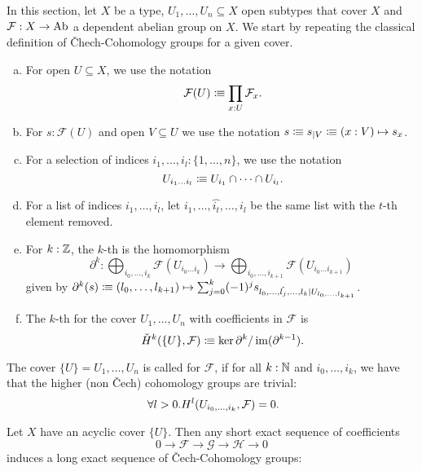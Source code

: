 
In this section, let $X$ be a type, $U_1,\dots,U_n\subseteq X$ open subtypes that cover $X$
and $\mathcal F:X\to \operatorname{Ab}$ a dependent abelian group on $X$.
We start by repeating the classical definition of \v{C}hech-Cohomology groups for a given cover.

\begin{definition}%
  \label{chech-complex}
  \begin{enumerate}[(a)]
  \item {} For open $U\subseteq X$, we use the notation
    \[
      \mathcal F(U)\colonequiv \prod_{x:U}\mathcal F_x\rlap{.}
    \]
  \item For $s:\mathcal F(U)$ and open $V\subseteq U$ we use the notation $s\vcentcolon\mspace{-1.2mu}\equiv s_{|V} \vcentcolon\mspace{-1.2mu}\equiv (x:V)\mapsto s_x$.
  \item {}For a selection of indices $i_1,...,i_l:\{1,\dots,n\}$, we use the notation
    \[
      U_{i_1\dots i_l}\colonequiv U_{i_1}\cap\dots\cap U_{i_l}\rlap{.}
    \]
  \item For a list of indices $i_1,\dots,i_l$, let $i_1,\dots,\hat{i_t},\dots,i_l$ be the same list with the $t$-th element removed.
  \item For $k:\mathbb{Z}$, the $k$-th  is the homomorphism
    \[
      \partial^k:\bigoplus_{i_0,\dots,i_k}\mathcal F(U_{i_0\dots i_k})\to \bigoplus_{i_0,\dots,i_{k+1}}\mathcal F(U_{i_0\dots i_{k+1}})
    \]
    given by $\partial^k(s)\vcentcolon\mspace{-1.2mu}\equiv (l_0,\dots,l_{k+1}) \mapsto \sum_{j=0}^k (-1)^j s_{l_0,\dots,\hat{l_j},\dots,l_k|U_{l_0,\dots,l_{k+1}}}$.
  \item The $k$-th  for the cover $U_1,\dots,U_n$ with coefficients in $\mathcal F$ is
    \[
      \check{H}^k(\{U\},\mathcal F)\colonequiv \ker\partial^{k} / \im(\partial^{k-1})\rlap{.}
    \]
  \end{enumerate}
\end{definition}

\begin{definition}
  The cover $\{U\}=U_1,\dots,U_n$ is called  for $\mathcal F$,
  if for all $k:\mathbb{N}$ and $i_0,\dots,i_k$, we have that the higher (non Čech) cohomology groups are trivial:
  \[
    \forall l>0. H^l(U_{i_0,\dots,i_k},\mathcal F)=0\rlap{.}
  \]
\end{definition}

\begin{theorem}%
  \label{chech-les}
  Let $X$ have an acyclic cover $\{U\}$.
  Then any short exact sequence of coefficients
  \[ 0\to \mathcal F\to \mathcal G\to \mathcal H\to 0\]
  induces a long exact sequence of \v{C}ech-Cohomology groups:
  \begin{center}
  \end{center}
\end{theorem}

